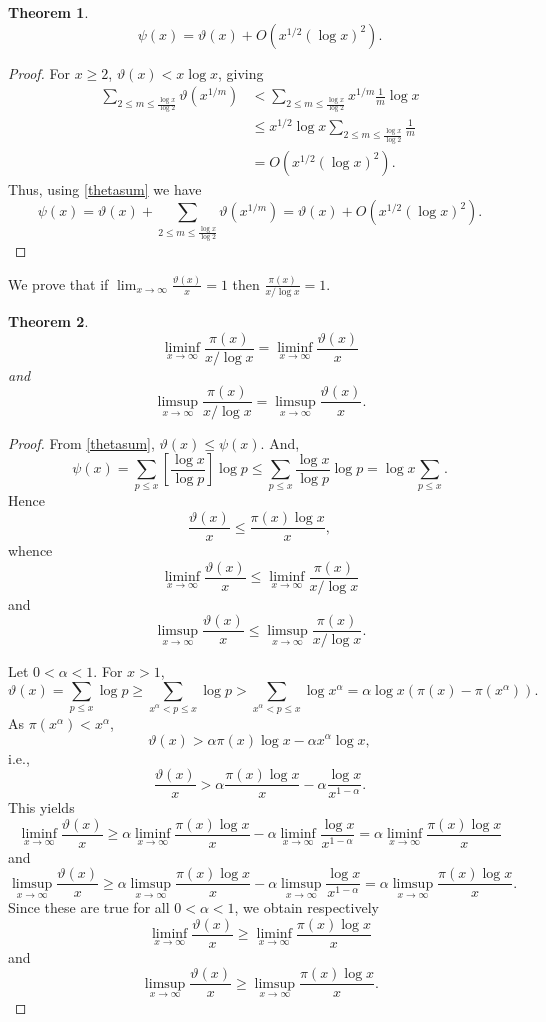 \documentclass{article}
\newtheorem{theorem}{Theorem}
\begin{document}
\begin{theorem}
\[
\psi(x) = \vartheta(x)+O(x^{1/2} (\log x)^2).
\]
\label{psitheta}
\end{theorem}
\begin{proof}
For $x \geq 2$,
$\vartheta(x)<x \log x$, giving
\begin{align*}
 \sum_{2 \leq m 
\leq \frac{\log x}{\log 2}} \vartheta(x^{1/m})
&< \sum_{2 \leq m 
\leq \frac{\log x}{\log 2}} x^{1/m} \frac{1}{m} \log x\\
&\leq x^{1/2} \log x \sum_{2 \leq m \leq \frac{\log x}{\log 2}} \frac{1}{m}\\
&=O(x^{1/2}(\log x)^2).
\end{align*}
Thus, using \eqref{thetasum} we have
\[
\psi(x) = \vartheta(x) +  \sum_{2 \leq m 
\leq \frac{\log x}{\log 2}} \vartheta(x^{1/m})=
\vartheta(x)+O(x^{1/2}(\log x)^2).
\]
\end{proof}


We prove that if $\lim_{x \to \infty} \frac{\vartheta(x)}{x}=1$ then
$\frac{\pi(x)}{x/\log x}=1$.

\begin{theorem}
\[
\liminf_{x \to \infty} \frac{\pi(x)}{x/\log x}
=\liminf_{x \to \infty} \frac{\vartheta(x)}{x}
\]
and
\[
\limsup_{x \to \infty} \frac{\pi(x)}{x/\log x}
=\limsup_{x \to \infty} \frac{\vartheta(x)}{x}.
\]
\end{theorem}
\begin{proof}
From \eqref{thetasum}, $\vartheta(x) \leq \psi(x)$. And,
\[
\psi(x)
=\sum_{p \leq x} \left[ \frac{\log x}{\log p}\right] \log p
\leq \sum_{p \leq x} \frac{\log x}{\log p} \log p
=\log x \sum_{p \leq x}.
\]
Hence
\[
\frac{\vartheta(x)}{x} \leq \frac{\pi(x) \log x}{x},
\]
whence
\[
\liminf_{x \to \infty} \frac{\vartheta(x)}{x}
\leq
\liminf_{x \to \infty} \frac{\pi(x)}{x/\log x}
\]
and
\[
\limsup_{x \to \infty} \frac{\vartheta(x)}{x}
\leq
\limsup_{x \to \infty} \frac{\pi(x)}{x/\log x}.
\]



Let $0<\alpha<1$. For $x>1$,
\[
\vartheta(x) = \sum_{p \leq x} \log p
\geq \sum_{x^\alpha<p \leq x} \log p
>\sum_{x^\alpha<p \leq x} \log x^\alpha
=\alpha \log x(\pi(x)-\pi(x^\alpha)).
\]
As $\pi(x^\alpha)<x^\alpha$,
\[
\vartheta(x) > \alpha \pi(x) \log x - \alpha x^\alpha \log x,
\]
i.e.,
\[
\frac{\vartheta(x)}{x} > \alpha \frac{\pi(x) \log x}{x} - \alpha \frac{\log x}{x^{1-\alpha}}.
\]
This yields 
\[
\liminf_{x \to \infty} \frac{\vartheta(x)}{x} \geq \alpha \liminf_{x \to \infty}
\frac{\pi(x) \log x}{x} - \alpha
\liminf_{x \to \infty} \frac{\log x}{x^{1-\alpha}}
=\alpha \liminf_{x \to \infty}
\frac{\pi(x) \log x}{x}
\]
and
\[
\limsup_{x \to \infty} \frac{\vartheta(x)}{x} 
\geq 
\alpha \limsup_{x \to \infty}
\frac{\pi(x) \log x}{x} - \alpha
\limsup_{x \to \infty} \frac{\log x}{x^{1-\alpha}}
=\alpha \limsup_{x \to \infty}
\frac{\pi(x) \log x}{x}.
\]
Since these are true for  all $0<\alpha<1$, we obtain respectively
\[
\liminf_{x \to \infty} \frac{\vartheta(x)}{x} \geq 
\liminf_{x \to \infty}
\frac{\pi(x) \log x}{x}
\]
and
\[
\limsup_{x \to \infty} \frac{\vartheta(x)}{x} \geq 
\limsup_{x \to \infty}
\frac{\pi(x) \log x}{x}.
\]
\end{proof}
\end{document}
